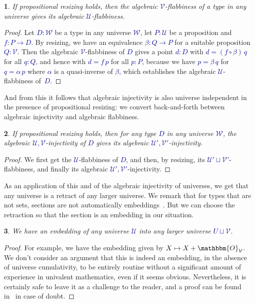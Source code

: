 \documentclass[10pt]{article}
\newcommand{\db}{\textcolor{darkblue}}
\newcommand{\m}[1]{\db{$#1$}}
\newcommand{\comp}{\mathrel{\circ}}
\newcommand{\U}{\mathcal{U}}
\newcommand{\V}{\mathcal{V}}
\newcommand{\W}{\mathcal{W}}
\newcommand{\Zero}{\mathbbm{O}}
\newtheorem{numbered}{}
\theoremstyle{definition}
\begin{document}
\begin{numbered}
  If propositional resizing holds, then the algebraic \m{\V}-flabbiness
  of a type in any universe gives its algebraic \m{\U}-flabbiness.
\end{numbered}
\begin{proof}
  Let \m{D:\W} be a type in any universe \m{\W}, let \m{P : \U} be a
  proposition and \m{f : P \to D}. By resizing, we have an equivalence
  \m{\beta : Q \to P} for a suitable proposition \m{Q:\V}.  Then the
  algebraic \m{\V}-flabbiness of \m{D} gives a point \m{d:D} with \m{d
    = (f \comp \beta) \, q} for all \m{q : Q}, and hence with \m{d = f
    \, p} for all \m{p : P}, because we have \m{p=\beta \, q} for \m{q
    = \alpha \, p} where \m{\alpha} is a quasi-inverse of \m{\beta},
  which establishes the algebraic \m{\U}-flabbiness of~\m{D}.
\end{proof}

And from this it follows that algebraic injectivity is also universe
independent in the presence of propositional resizing: we convert
back-and-forth between algebraic injectivity and algebraic flabbiness.

\begin{numbered}
  If propositional resizing holds, then for any type \m{D} in any universe
  \m{\W}, the algebraic \m{\U,\V}-injectivity of \m{D} gives its
  algebraic \m{\U',\V'}-injectivity.
\end{numbered}
\begin{proof}
  We first get the \m{\U}-flabbiness of \m{D}, and then, by resizing, its
  \m{\U' \sqcup \V'}-flabbiness, and finally its algebraic
  \m{\U',\V'}-injectivity.
\end{proof}

As an application of this and of the algebraic injectivity of
universes, we get that any universe is a retract of any larger
universe.  We remark that for types that are not sets, sections are
not automatically embeddings~\cite{MR3548859}. But we can choose the
retraction so that the section is an embedding in our situation.

\begin{numbered}
  We have an embedding of any universe \m{\U} into any larger universe \m{U \sqcup \V}.
\end{numbered}
\begin{proof}
  For example, we have the embedding given by \m{X \mapsto X +
    \Zero_\V}. We don't consider an argument that this is indeed an
  embedding, in the absence of universe cumulativity, to be entirely
  routine without a significant amount of experience in univalent
  mathematics, even if it seems obvious. Nevertheless, it is certainly
  safe to leave it as a challenge to the reader, and a proof can be
  found in~\cite{injective:article} in case of doubt.
\end{proof}
\end{document}
